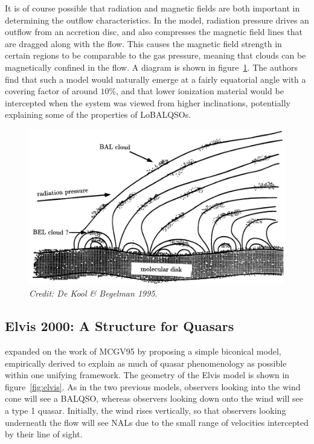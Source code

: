 It is of course possible that radiation and magnetic fields are both important
in determining the outflow characteristics. In the \cite{dekool1995} model, radiation
pressure drives an outflow from an accretion disc, and also compresses the magnetic
field lines that are dragged along with the flow. This causes the magnetic field
strength in certain regions to be comparable to the gas pressure, meaning that clouds
can be magnetically confined in the flow. A diagram is shown in figure~\ref{fig:dekool}.
The authors find that such a model would naturally emerge at a fairly equatorial
angle with a covering factor of around $10\%$, and that lower ionization material 
would be intercepted when the system was viewed from higher inclinations, potentially
explaining some of the properties of LoBALQSOs.

\begin{figure}
\centering
\includegraphics[width=1.0\textwidth]{figures/02-outflows/dekool.png}
\caption
{
{\sl Credit: De Kool \& Begelman 1995}. 
} 
\label{fig:dekool}
\end{figure}


\subsection{Elvis 2000: A Structure for Quasars}

\cite{elvis2000} expanded on the work of MCGV95 by proposing a simple
biconical model, empirically derived to explain as much of quasar phenomenology
as possible within one unifying framework. The geometry of the Elvis model
is shown in figure~\ref{fig:elvis}. As in the two previous models, observers 
looking into the wind cone will see a BALQSO, whereas observers looking down onto
the wind will see a type 1 quasar. Initially, the wind rises vertically, so
that observers looking underneath the flow will see NALs
due to the small range of velocities intercepted by their line of sight. 

